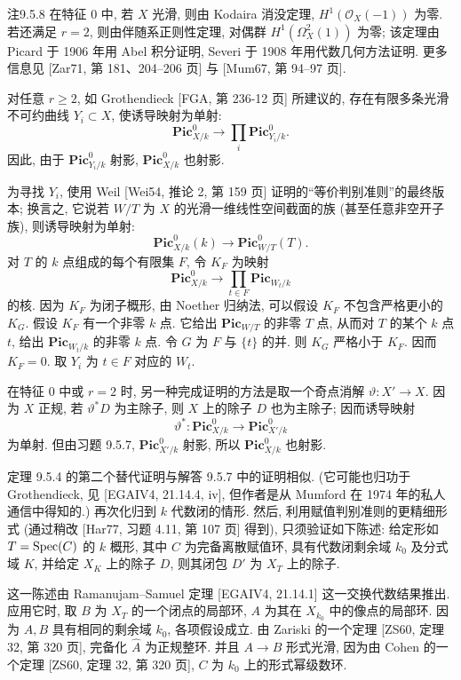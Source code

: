 \begin{origstatement}{注}{9.5.8}
在特征 $0$ 中, 若 $X$ 光滑, 则由 Kodaira 消没定理, $H^1(\mathcal O_X(-1))$ 为零. 若还满足 $r=2$, 则由伴随系正则性定理, 对偶群 $H^1(\Omega_X^2(1))$ 为零; 该定理由 Picard 于 1906 年用 Abel 积分证明, Severi 于 1908 年用代数几何方法证明. 更多信息见 [Zar71, 第 181、204--206 页] 与 [Mum67, 第 94--97 页].

对任意 $r\geq2$, 如 Grothendieck [FGA, 第 236-12 页] 所建议的, 存在有限多条光滑不可约曲线 $Y_i\subset X$, 使诱导映射为单射:
\[
 \mathbf{Pic}^0_{X/k}\longrightarrow\prod_i\mathbf{Pic}^0_{Y_i/k}.
\]
因此, 由于 $\mathbf{Pic}^0_{Y_i/k}$ 射影, $\mathbf{Pic}^0_{X/k}$ 也射影.

为寻找 $Y_i$, 使用 Weil [Wei54, 推论 2, 第 159 页] 证明的“等价判别准则”的最终版本; 换言之, 它说若 $W/T$ 为 $X$ 的光滑一维线性空间截面的族 (甚至任意非空开子族), 则诱导映射为单射:
\[
 \mathbf{Pic}^0_{X/k}(k)\longrightarrow\mathbf{Pic}^0_{W/T}(T).
\]
对 $T$ 的 $k$ 点组成的每个有限集 $F$, 令 $K_F$ 为映射
\[
 \mathbf{Pic}^0_{X/k}\longrightarrow\prod_{t\in F}\mathbf{Pic}_{W_t/k}
\]
的核. 因为 $K_F$ 为闭子概形, 由 Noether 归纳法, 可以假设 $K_F$ 不包含严格更小的 $K_G$. 假设 $K_F$ 有一个非零 $k$ 点. 它给出 $\mathbf{Pic}_{W/T}$ 的非零 $T$ 点, 从而对 $T$ 的某个 $k$ 点 $t$, 给出 $\mathbf{Pic}_{W_t/k}$ 的非零 $k$ 点. 令 $G$ 为 $F$ 与 $\{t\}$ 的并. 则 $K_G$ 严格小于 $K_F$. 因而 $K_F=0$. 取 $Y_i$ 为 $t\in F$ 对应的 $W_t$.

在特征 $0$ 中或 $r=2$ 时, 另一种完成证明的方法是取一个奇点消解 $\vartheta:X'\to X$. 因为 $X$ 正规, 若 $\vartheta^*D$ 为主除子, 则 $X$ 上的除子 $D$ 也为主除子; 因而诱导映射
\[
 \vartheta^*:\mathbf{Pic}^0_{X/k}\longrightarrow\mathbf{Pic}^0_{X'/k}
\]
为单射. 但由习题 9.5.7, $\mathbf{Pic}^0_{X'/k}$ 射影, 所以 $\mathbf{Pic}^0_{X/k}$ 也射影.

定理 9.5.4 的第二个替代证明与解答 9.5.7 中的证明相似. (它可能也归功于 Grothendieck, 见 [EGAIV4, 21.14.4, iv], 但作者是从 Mumford 在 1974 年的私人通信中得知的.) 再次化归到 $k$ 代数闭的情形. 然后, 利用赋值判别准则的更精细形式 (通过稍改 [Har77, 习题 4.11, 第 107 页] 得到), 只须验证如下陈述: 给定形如 $T=\operatorname{Spec}(C)$ 的 $k$ 概形, 其中 $C$ 为完备离散赋值环, 具有代数闭剩余域 $k_0$ 及分式域 $K$, 并给定 $X_K$ 上的除子 $D$, 则其闭包 $D'$ 为 $X_T$ 上的除子.

这一陈述由 Ramanujam--Samuel 定理 [EGAIV4, 21.14.1] 这一交换代数结果推出. 应用它时, 取 $B$ 为 $X_T$ 的一个闭点的局部环, $A$ 为其在 $X_{k_0}$ 中的像点的局部环. 因为 $A,B$ 具有相同的剩余域 $k_0$, 各项假设成立. 由 Zariski 的一个定理 [ZS60, 定理 32, 第 320 页], 完备化 $\widehat A$ 为正规整环. 并且 $A\to B$ 形式光滑, 因为由 Cohen 的一个定理 [ZS60, 定理 32, 第 320 页], $C$ 为 $k_0$ 上的形式幂级数环.


\end{origstatement}
